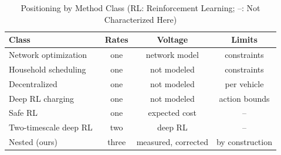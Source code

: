 \documentclass[journal]{IEEEtran}
\begin{document}
\begin{table}[t]
\centering
\caption{Positioning by Method Class (RL: Reinforcement Learning;
 --: Not Characterized Here)}
\label{tab:positioning}
\footnotesize
\setlength{\tabcolsep}{3pt}
\begin{tabular}{@{}lccc@{}}
\toprule
Class & Rates & Voltage & Limits \\
\midrule
Network optimization~\cite{clement2010} & one & network model & constraints \\
Household scheduling~\cite{ortegavazquez2014} & one & not modeled & constraints \\
Decentralized~\cite{ma2013,xu2016priority} & one & not modeled & per vehicle \\
Deep RL charging~\cite{wan2019,zhang2020cddpg} & one & not modeled & action bounds \\
Safe RL~\cite{achiam2017,wang2020voltvar} & one & expected cost & -- \\
Two-timescale deep RL~\cite{wang2025flash} & two & deep RL & -- \\
Nested (ours) & three & measured, corrected & by construction \\
\bottomrule
\end{tabular}
\end{table}
\end{document}
